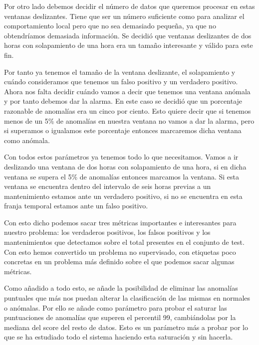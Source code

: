 Por otro lado debemos decidir el número de datos que queremos procesar en estas ventanas deslizantes. Tiene que ser un número suficiente como para analizar el comportamiento local pero que no sea demasiado pequeña, ya que no obtendríamos demasiada información. Se decidió que ventanas deslizantes de dos horas con solapamiento de una hora era un tamaño interesante y válido para este fin.

Por tanto ya tenemos el tamaño de la ventana deslizante, el solapamiento y cuándo consideramos que tenemos un falso positivo y un verdadero positivo. Ahora nos falta decidir cuándo vamos a decir que tenemos una ventana anómala y por tanto debemos dar la alarma. En este caso se decidió que un porcentaje razonable de anomalías era un cinco por ciento. Esto quiere decir que si tenemos menos de un 5\% de anomalías en nuestra ventana no vamos a dar la alarma, pero si superamos o igualamos este porcentaje entonces marcaremos dicha ventana como anómala.

Con todos estos parámetros ya tenemos todo lo que necesitamos. Vamos a ir deslizando una ventana de dos horas con solapamiento de una hora, si en dicha ventana se supera el 5\% de anomalías entonces marcamos la ventana. Si esta ventana se encuentra dentro del intervalo de seis horas previas a un mantenimiento estamos ante un verdadero positivo, si no se encuentra en esta franja temporal estamos ante un falso positivo.

Con esto dicho podemos sacar tres métricas importantes e interesantes para nuestro problema: los verdaderos positivos, los falsos positivos y los mantenimientos que detectamos sobre el total presentes en el conjunto de test. Con esto hemos convertido un problema no supervisado, con etiquetas poco concretas en un problema más definido sobre el que podemos sacar algunas métricas.

Como añadido a todo esto, se añade la posibilidad de eliminar las anomalías puntuales que más nos puedan alterar la clasificación de las mismas en normales o anómalas. Por ello se añade como parámetro para probar el saturar las puntuaciones de anomalías que superen el percentil 99, cambiándolas por la mediana del score del resto de datos. Esto es un parámetro más a probar por lo que se ha estudiado todo el sistema haciendo esta saturación y sin hacerla.